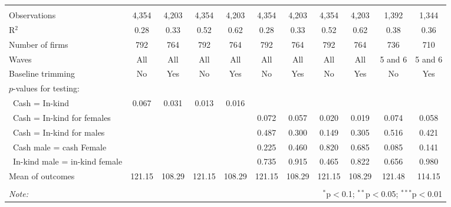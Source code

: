 \documentclass{report}
\begin{document}
\begin{table}[!htbp]
\begin{tabular}{@{\extracolsep{5pt}}lcccccccccc}
  & & & & & & & & & & \\ 
\hline \\[-1.8ex] 
Observations & 4,354 & 4,203 & 4,354 & 4,203 & 4,354 & 4,203 & 4,354 & 4,203 & 1,392 & 1,344 \\ 
R$^{2}$ & 0.28 & 0.33 & 0.52 & 0.62 & 0.28 & 0.33 & 0.52 & 0.62 & 0.38 & 0.36 \\ 
Number of firms & 792 & 764 & 792 & 764 & 792 & 764 & 792 & 764 & 736 & 710 \\ 
Waves & All & All & All & All & All & All & All & All & 5 and 6 & 5 and 6 \\ 
Baseline trimming & No & Yes & No & Yes & No & Yes & No & Yes & No & Yes \\ 
$p$-values for testing: &  &  &  &  &  &  &  &  &  &  \\ 
\  Cash = In-kind & 0.067 & 0.031 & 0.013 & 0.016 &  &  &  &  &  &  \\ 
\  Cash = In-kind for females &  &  &  &  & 0.072 & 0.057 & 0.020 & 0.019 & 0.074 & 0.058 \\ 
\  Cash = In-kind for males &  &  &  &  & 0.487 & 0.300 & 0.149 & 0.305 & 0.516 & 0.421 \\ 
\  Cash male = cash Female &  &  &  &  & 0.225 & 0.460 & 0.820 & 0.685 & 0.085 & 0.141 \\ 
\  In-kind male = in-kind female &  &  &  &  & 0.735 & 0.915 & 0.465 & 0.822 & 0.656 & 0.980 \\ 
Mean of outcomes & 121.15 & 108.29 & 121.15 & 108.29 & 121.15 & 108.29 & 121.15 & 108.29 & 121.48 & 114.15 \\ 
\hline \\[-1.8ex] 
\textit{Note:}  & \multicolumn{10}{r}{$^{*}$p$<$0.1; $^{**}$p$<$0.05; $^{***}$p$<$0.01} \\ 
\end{tabular} 
\end{table} 
\end{document}
